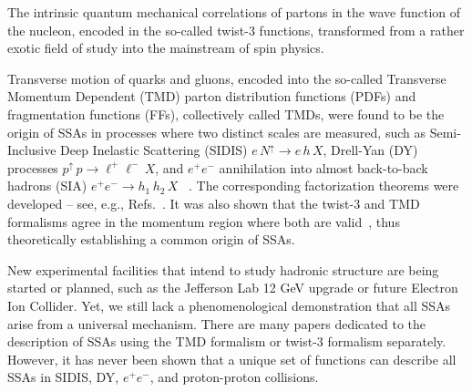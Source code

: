 \documentclass[twocolumn,prl,aps,superscriptaddress
               ,footinbib,amsfonts,amsmath,amssymb,showpacs]{revtex4-1}
\begin{document}
The intrinsic quantum mechanical correlations of partons in the wave
function of the nucleon, encoded in the so-called twist-3 functions,
transformed from a rather exotic field of study into the mainstream of
spin physics. 
%



Transverse motion of quarks and gluons, encoded into the so-called
Transverse Momentum Dependent (TMD) parton distribution functions
(PDFs) and fragmentation functions (FFs), collectively called TMDs,
were found to be the origin of SSAs in processes where two distinct
scales are measured, such as Semi-Inclusive Deep Inelastic Scattering
(SIDIS) $e\,N^\uparrow \to e\,h\,X$, Drell-Yan (DY) processes
$p^\uparrow \,p \to \ell^+\ell^-\, X$, 
and $e^+e^-$ annihilation into almost back-to-back hadrons (SIA) 
$e^+e^- \to h_1\,h_2\,X$
~\cite{Mulders:1995dh, Boer:1997mf, Bacchetta:2006tn,
Arnold:2008kf, Pitonyak:2013dsu}.
%
The corresponding factorization theorems were developed -- see, e.g.,
Refs.~\cite{Collins:2011zzd,GarciaEchevarria:2011rb}.  
%
It was also shown that the twist-3 and TMD formalisms agree in the
momentum region where both are
valid~\cite{Ji:2006br, Koike:2007dg, Ji:2006ub,
Yuan:2009dw,Zhou:2008fb,Zhou:2009jm},
thus theoretically establishing a common origin of SSAs. 

New experimental facilities that intend to study hadronic structure
are being started or planned, such as the Jefferson Lab 12 GeV upgrade
or future Electron Ion Collider.
%
Yet, we still lack a phenomenological demonstration that all SSAs
arise from a universal mechanism. 
%
There are many papers dedicated to the description of SSAs using the
TMD formalism or twist-3 formalism separately.  
%
However, it has never been shown that a unique set of functions can
describe all SSAs in SIDIS, DY, $e^+e^-$, and proton-proton
collisions. 
\end{document}
